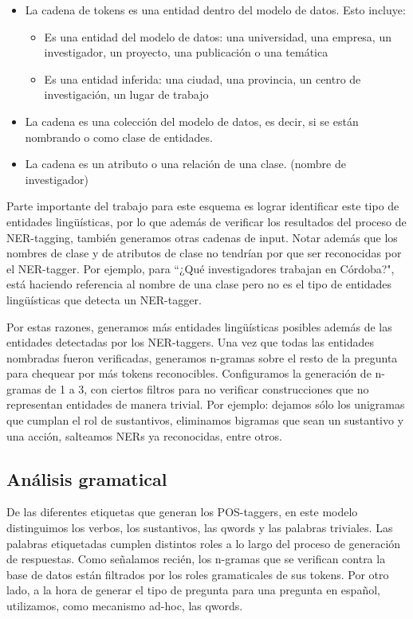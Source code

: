 \begin{itemize}
  \item La cadena de tokens es una entidad dentro del modelo de datos. Esto incluye:
    \begin{itemize}
      \item Es una entidad del modelo de datos: una universidad, una empresa, un investigador, un proyecto, una publicación o una temática
      \item Es una entidad inferida: una ciudad, una provincia, un centro de investigación, un lugar de trabajo
    \end{itemize}
  \item La cadena es una colección del modelo de datos, es decir, si se están nombrando  o  como clase de entidades.
  \item La cadena es un atributo o una relación de una clase. (nombre de investigador)
\end{itemize}

Parte importante del trabajo para este esquema es lograr identificar este tipo de entidades lingüísticas, por lo que además de verificar los resultados del proceso de NER-tagging, también generamos otras cadenas de input. Notar además que los nombres de clase y de atributos de clase no tendrían por que ser reconocidas por el NER-tagger. Por ejemplo, para ``¿Qué investigadores trabajan en Córdoba?",  está haciendo referencia al nombre de una clase pero no es el tipo de entidades lingüísticas que detecta un NER-tagger. 

Por estas razones, generamos más entidades lingüísticas posibles además de las entidades detectadas por los NER-taggers. Una vez que todas las entidades nombradas fueron verificadas, generamos n-gramas sobre el resto de la pregunta para chequear por más tokens reconocibles. Configuramos la generación de n-gramas de 1 a 3, con ciertos filtros para no verificar construcciones que no representan entidades de manera trivial. Por ejemplo: dejamos sólo los unigramas que cumplan el rol de sustantivos, eliminamos bigramas que sean un sustantivo y una acción, salteamos NERs ya reconocidas, entre otros.


\subsection{Análisis gramatical}
\label{subsec:impl-pos}
De las diferentes etiquetas que generan los POS-taggers, en este modelo distinguimos los verbos, los sustantivos, las qwords y las palabras triviales. 
Las palabras etiquetadas cumplen distintos roles a lo largo del proceso de generación de respuestas. Como señalamos recién, los n-gramas que se verifican contra la base de datos están filtrados por los roles gramaticales de sus tokens. Por otro lado, a la hora de generar el tipo de pregunta para una pregunta en español, utilizamos, como mecanismo ad-hoc, las qwords. 


